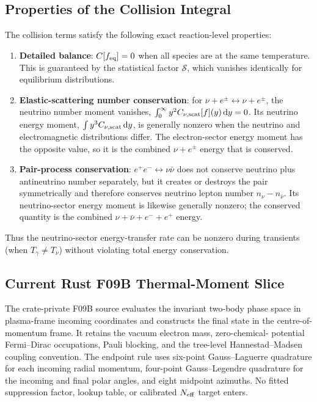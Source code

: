 \subsection{Properties of the Collision Integral}

The collision terms satisfy the following exact reaction-level properties:

\begin{enumerate}
\item \textbf{Detailed balance}: $C[f_{\rm eq}] = 0$ when all species are at the same temperature.  This is guaranteed by the statistical factor $\mathcal{S}$, which vanishes identically for equilibrium distributions.

\item \textbf{Elastic-scattering number conservation}: for $\nu+e^\pm\leftrightarrow\nu+e^\pm$, the neutrino number moment vanishes, $\int_0^\infty y^2 C_{\nu,\rm scat}[f](y)\,\mathrm{d} y=0$.  Its neutrino energy moment, $\int y^3 C_{\nu,\rm scat}\,\mathrm{d} y$, is generally nonzero when the neutrino and electromagnetic distributions differ.  The electron-sector energy moment has the opposite value, so it is the combined $\nu+e^\pm$ energy that is conserved.

\item \textbf{Pair-process conservation}: $e^+e^-\leftrightarrow\nu\bar\nu$ does not conserve neutrino plus antineutrino number separately, but it creates or destroys the pair symmetrically and therefore conserves neutrino lepton number $n_\nu-n_{\bar\nu}$.  Its neutrino-sector energy moment is likewise generally nonzero; the conserved quantity is the combined $\nu+\bar\nu+e^-+e^+$ energy.
\end{enumerate}

Thus the neutrino-sector energy-transfer rate can be nonzero during transients (when $T_\gamma \neq T_\nu$) without violating total energy conservation.

\subsection{Current Rust F09B Thermal-Moment Slice}

The crate-private F09B source evaluates the invariant two-body phase space in
plasma-frame incoming coordinates and constructs the final state in the
centre-of-momentum frame.  It retains the vacuum electron mass, zero-chemical-
potential Fermi--Dirac occupations, Pauli blocking, and the tree-level
Hannestad--Madsen coupling convention.  The endpoint rule uses six-point
Gauss--Laguerre quadrature for each incoming radial momentum, four-point
Gauss--Legendre quadrature for the incoming and final polar angles, and eight
midpoint azimuths.  No fitted suppression factor, lookup table, or calibrated
$N_{\rm eff}$ target enters.

